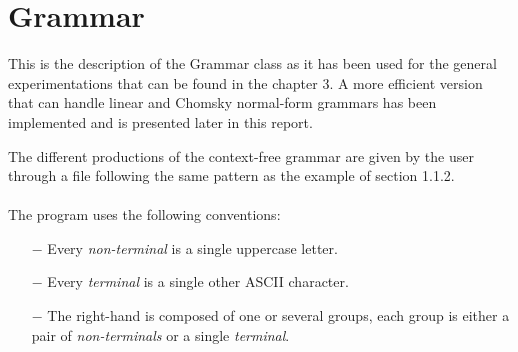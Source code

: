 
\section{Grammar}

This is the description of the Grammar class as it has been used for the general experimentations that can be found in the chapter 3.
A more efficient version that can handle linear and Chomsky normal-form grammars has been implemented and is presented later in this report.

The different productions of the context-free grammar are given by the user through a file following the same pattern as the example of section 1.1.2.
\\
\\
The program uses the following conventions:
\begin{itemize}
    \item[$-$] Every \textit{non-terminal} is a single uppercase letter.
    \item[$-$] Every \textit{terminal} is a single other ASCII character.
    \item[$-$] The right-hand is composed of one or several groups, each group is either a pair of \textit{non-terminals} or a single \textit{terminal}.
\end{itemize}

